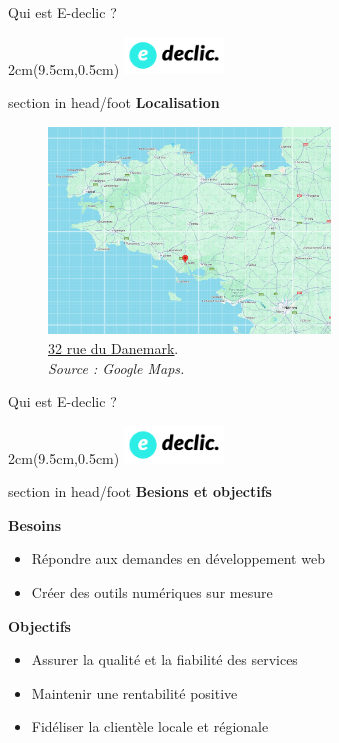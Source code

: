 \documentclass{beamer}
\newcommand{\logoEdeclic}{
	\begin{textblock*}{2cm}(9.5cm,0.5cm)
  		\includegraphics[height=1cm]{../img/logo_e-declic.png}
	\end{textblock*}
}
\begin{document}
\begin{frame}{Qui est E-declic ?}
	\logoEdeclic

	\begin{beamercolorbox}[wd=\paperwidth,ht=1.5em,dp=0.5em,leftskip=0.5cm]{section in head/foot}
  		\large \textbf{Localisation}
	\end{beamercolorbox}
	\vspace{0.5em}
	\begin{center}
  		\begin{minipage}{0.9\textwidth}
			\begin{figure}[t]
  				\includegraphics[height=5.5cm]{../img/localisation.png}
				\caption{				
  					\href{https://maps.app.goo.gl/11j9ZHKrL6TVrdYB6}{\underline{32 rue du Danemark}}.\\
  					\textit{Source : Google Maps.}
				}
  				\label{fig:localisation}
  			\end{figure}
  		\end{minipage}
	\end{center}
	\vfill
\end{frame}

\begin{frame}{Qui est E-declic ?}
	\logoEdeclic
	
	\begin{beamercolorbox}[wd=\paperwidth,ht=1.5em,dp=0.5em,leftskip=0.5cm]{section in head/foot}
  		\large \textbf{Besions et objectifs}
	\end{beamercolorbox}
	\vspace{0.5em}
	\begin{center}
  		\begin{minipage}{0.9\textwidth}
			\textbf{Besoins}
			\begin{itemize}
				\item Répondre aux demandes en développement web
				\item Créer des outils numériques sur mesure
			\end{itemize}
	
			\textbf{Objectifs}
			\begin{itemize}
				\item Assurer la qualité et la fiabilité des services
				\item Maintenir une rentabilité positive
				\item Fidéliser la clientèle locale et régionale
			\end{itemize}
  		\end{minipage}
	\end{center}
	\vfill
\end{frame}
\end{document}
